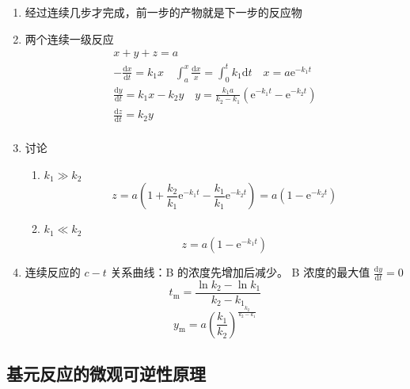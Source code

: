 \begin{enumerate}
    \item 经过连续几步才完成，前一步的产物就是下一步的反应物
    \item 两个连续一级反应
    \begin{equation*}
        \begin{aligned}
            x + y + z = a \\
            -\frac{\mathrm{d}x}{\mathrm{d}t} = k_1 x \quad \int_{a}^{x} \frac{\mathrm{d}x}{x} = \int_{0}^{t} k_1 \mathrm{d}t \quad x = a \mathrm{e}^{-k_1 t} \\
            \frac{\mathrm{d}y}{\mathrm{d}t} = k_1 x - k_2 y \quad y = \frac{k_1 a}{k_2 - k_1} (\mathrm{e}^{-k_1 t} - \mathrm{e}^{-k_2 t}) \\
            \frac{\mathrm{d}z}{\mathrm{d}t} = k_2 y \\
        \end{aligned}
    \end{equation*}
    \item 讨论
    \begin{enumerate}
        \item $k_1 \gg k_2$
        \begin{equation*}
            z = a \left(1 + \frac{k_2}{k_1} \mathrm{e}^{-k_1 t} - \frac{k_1}{k_1} \mathrm{e}^{-k_2 t}\right) = a \left(1 - \mathrm{e}^{-k_2 t}\right)
        \end{equation*}
        \item $k_1 \ll k_2$
        \begin{equation*}
            z = a \left(1 - \mathrm{e}^{-k_1 t}\right)
        \end{equation*}
    \end{enumerate}
    \item 连续反应的 $c - t$ 关系曲线：B 的浓度先增加后减少。 %
    B 浓度的最大值 $\frac{\mathrm{d}y}{\mathrm{d}t} = 0$
    \begin{equation*}
        t_{\mathrm{m}} = \frac{\ln{k_2} - \ln{k_1}}{k_2 - k_1}
    \end{equation*}
    \begin{equation}
        y_{\mathrm{m}} = a \left(\frac{k_1}{k_2}\right)^{\frac{k_2}{k_2 - k_1}}
    \end{equation}
\end{enumerate}

\subsection{基元反应的微观可逆性原理}

